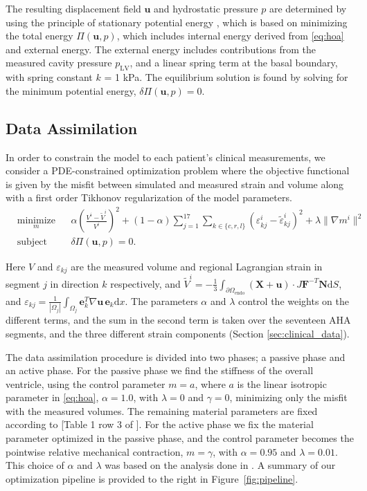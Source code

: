\documentclass[times]{elsarticle}
\newcommand{\Xvec}{\mathbf{X}}
\newcommand{\uvec}{\mathbf{u}}
\newcommand{\N}{\mathbf{N}}
\newcommand{\F}{\mathbf{F}}
\begin{document}
The resulting displacement field $\uvec$ and hydrostatic pressure $p$
are determined by using the principle of stationary potential energy
\cite{holzapfel2000nonlinear}, which is based on minimizing the total
energy  $\Pi(\uvec, p)$, which includes internal energy derived from
\eqref{eq:hoa} and external energy. The external energy includes
contributions from the measured cavity pressure $p_{\text{LV}}$, and a
linear spring term at the basal boundary, with spring constant
$k$ = 1 kPa. The equilibrium solution is found by solving for the minimum
potential energy, $\delta\Pi(\uvec, p) = 0$. 

\subsection{Data Assimilation}
In order to constrain the model to each patient's clinical measurements, we
consider a PDE-constrained optimization problem where
the objective functional is given by the misfit between
simulated and measured strain and volume along with a first order Tikhonov regularization of the
model parameters.
\begin{equation}
  \begin{aligned}
    \label{eq:pde_opt}
    & \underset{m}{\text{minimize}}
    & &  \alpha \left( \frac{V^i - \tilde{V}^i}{V^i} \right)^2
    + (1-\alpha)  \sum_{j= 1}^{17} \sum_{k \in \{c,r,l\}}  \left( \varepsilon_{kj}^i
      -  \tilde{\varepsilon}_{kj}^i \right)^2
    + \lambda \| \nabla m^i \|^2 \\
    & \text{subject to}
    & & \delta \Pi(\uvec, p) = 0.
  \end{aligned}
\end{equation}


Here $V$ and $\varepsilon_{kj}$ are the measured volume and regional Lagrangian strain in
segment $j$ in direction $k$ respectively, and $\tilde{V}^i =
-\frac{1}{3} \int_{\partial \Omega_{\text{endo}}} (\Xvec + \uvec)
\cdotp J\F^{-T}\N  \mathrm{d}S$,  and $\varepsilon_{kj} =
\frac{1}{|\Omega_j|}\int_{\Omega_j}  \mathbf{e}_k^T \nabla \uvec \,
\mathbf{e}_k  \mathrm{d}x.$ 
The parameters $\alpha$ and $\lambda$
control the weights on the different terms, and the sum in the second
term is taken over the seventeen AHA
segments, and the three different strain components (Section \ref{sec:clinical_data}).


The data assimilation procedure is divided into two phases; a passive
phase and an active phase. For the passive phase we find the stiffness
of the overall ventricle,  using the control parameter $m = a$, where
$a$ is the linear isotropic parameter in \eqref{eq:hoa}, $\alpha=
1.0$,  with $\lambda = 0$ and $\gamma = 0$, minimizing only the misfit
with the measured volumes. The remaining material parameters are fixed
according to [Table 1 row 3 of \cite{holzapfel2009constitutive}].
For the active phase we fix the material
parameter optimized in the passive phase, and the control parameter
becomes the pointwise relative mechanical contraction, $m = \gamma$,
with $\alpha = 0.95$ and $\lambda = 0.01$. This choice of $\alpha$ and
$\lambda$ was based on the analysis done in \cite{balaban}. A summary
of our optimization pipeline is provided to the right in
Figure~\ref{fig:pipeline}.  
\end{document}
